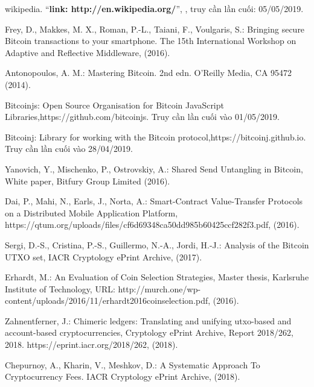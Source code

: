 \begin{thebibliography}{80}

     wikipedia.
    ``\textbf{link: http://en.wikipedia.org/}'',
    \textit{}, truy cần lần cuối: 05/05/2019.
    
    
        	Frey, D., Makkes, M. X., Roman, P.-L., Taiani,  F.,  Voulgaris, S.: Bringing secure Bitcoin transactions to your smartphone. The 15th International Workshop on Adaptive and Reflective Middleware, (2016).
        
         Antonopoulos, A. M.: Mastering Bitcoin. 2nd edn. O'Reilly Media, CA 95472 (2014).
        
         Bitcoinjs: Open Source Organisation for Bitcoin JavaScript Libraries,https://github.com/bitcoinjs. Truy cần lần cuối vào 01/05/2019.
        
        	Bitcoinj: Library for working with the Bitcoin protocol,https://bitcoinj.github.io. Truy cần lần cuối vào 28/04/2019.
        
         Yanovich, Y., Mischenko, P.,  Ostrovskiy,  A.:  Shared Send Untangling in Bitcoin, White paper, Bitfury Group Limited (2016).
        
         Dai, P., Mahi, N., Earls, J., Norta, A.: Smart-Contract Value-Transfer Protocols on a Distributed Mobile Application Platform, https://qtum.org/uploads/files/cf6d69348ca50dd985b60425ccf282f3.pdf, (2016).
        
         Sergi, D.-S., Cristina, P.-S., Guillermo, N.-A., Jordi, H.-J.: Analysis of the Bitcoin UTXO set, IACR Cryptology ePrint Archive, (2017).
        
         Erhardt, M.: An Evaluation of Coin Selection
        Strategies, Master thesis, Karlsruhe Institute of Technology, URL: http://murch.one/wp-content/uploads/2016/11/erhardt2016coinselection.pdf, (2016).
        
         Zahnentferner, J.: Chimeric ledgers: Translating and unifying utxo-based and account-based cryptocurrencies, Cryptology ePrint Archive, Report 2018/262, 2018. https://eprint.iacr.org/2018/262, (2018).
        
         Chepurnoy, A., Kharin, V., Meshkov, D.: A Systematic Approach To Cryptocurrency Fees. IACR Cryptology ePrint Archive, (2018).
    \end{thebibliography}